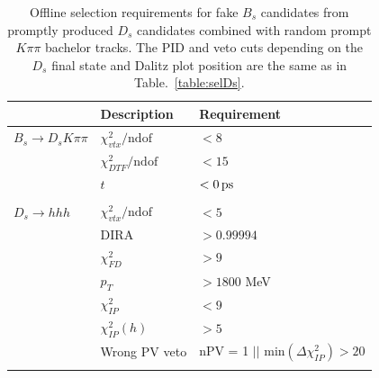\begin{table}[h]
\centering
\caption{Offline selection requirements for fake $B_s$ candidates from promptly produced $D_s$ candidates combined with random prompt $K\pi\pi$ bachelor tracks.
The PID and veto cuts depending on the $D_s$ final state and Dalitz plot position are the same as in Table.~\ref{table:selDs}.
}
 \renewcommand{\arraystretch}{1.1}
 \small
 \begin{tabular}{l l l}
\hline
\hline
 & Description & Requirement  \\
\hline
$B_s \to D_s K \pi \pi$  &  $\chi^{2}_{vtx}/\text{ndof}  $&$ <  8$ \\
&  $\chi^{2}_{DTF}/\text{ndof} $&$   <  15 $ \\
& $t$  & $< 0 {\mathrm{ \,ps}}$ \\
\\
$D_s \to h h h$ &  $\chi^{2}_{vtx}/\text{ndof}  $&$ <  5$  \\
& DIRA &$ > 0.99994$ \\
& $\chi^{2}_{FD}$ & $> 9$ \\
& $p_T$ & $> 1800$ MeV \\
& $\chi^{2}_{IP}$ & $< 9$ \\
&  $\chi^{2}_{IP}(h)$ &  $> 5$ \\
& Wrong PV veto & nPV = 1 $||$  $\text{min}(\Delta\chi^{2}_{IP}) > 20$ \\
\\

\end{tabular}
\end{table}
